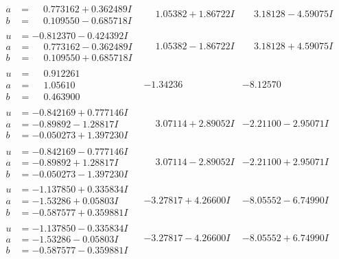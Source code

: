 \documentclass[1p]{elsarticle_modified}
\theoremstyle{definition}
\begin{document}
$$\begin{array}{c|c|c}
\begin{aligned}
a &= \phantom{-}0.773162 + 0.362489 I \\
b &= \phantom{-}0.109550 - 0.685718 I\end{aligned}
 & \phantom{-}1.05382 + 1.86722 I & \phantom{-}3.18128 - 4.59075 I \\ \hline\begin{aligned}
u &= -0.812370 - 0.424392 I \\
a &= \phantom{-}0.773162 - 0.362489 I \\
b &= \phantom{-}0.109550 + 0.685718 I\end{aligned}
 & \phantom{-}1.05382 - 1.86722 I & \phantom{-}3.18128 + 4.59075 I \\ \hline\begin{aligned}
u &= \phantom{-}0.912261\phantom{ +0.000000I} \\
a &= \phantom{-}1.05610\phantom{ +0.000000I} \\
b &= \phantom{-}0.463900\phantom{ +0.000000I}\end{aligned}
 & -1.34236\phantom{ +0.000000I} & -8.12570\phantom{ +0.000000I} \\ \hline\begin{aligned}
u &= -0.842169 + 0.777146 I \\
a &= -0.89892 - 1.28817 I \\
b &= -0.050273 + 1.397230 I\end{aligned}
 & \phantom{-}3.07114 + 2.89052 I & -2.21100 - 2.95071 I \\ \hline\begin{aligned}
u &= -0.842169 - 0.777146 I \\
a &= -0.89892 + 1.28817 I \\
b &= -0.050273 - 1.397230 I\end{aligned}
 & \phantom{-}3.07114 - 2.89052 I & -2.21100 + 2.95071 I \\ \hline\begin{aligned}
u &= -1.137850 + 0.335834 I \\
a &= -1.53286 + 0.05803 I \\
b &= -0.587577 + 0.359881 I\end{aligned}
 & -3.27817 + 4.26600 I & -8.05552 - 6.74990 I \\ \hline\begin{aligned}
u &= -1.137850 - 0.335834 I \\
a &= -1.53286 - 0.05803 I \\
b &= -0.587577 - 0.359881 I\end{aligned}
 & -3.27817 - 4.26600 I & -8.05552 + 6.74990 I \\ \hline\begin{aligned}

\end{aligned}
\end{array}$$
\end{document}
